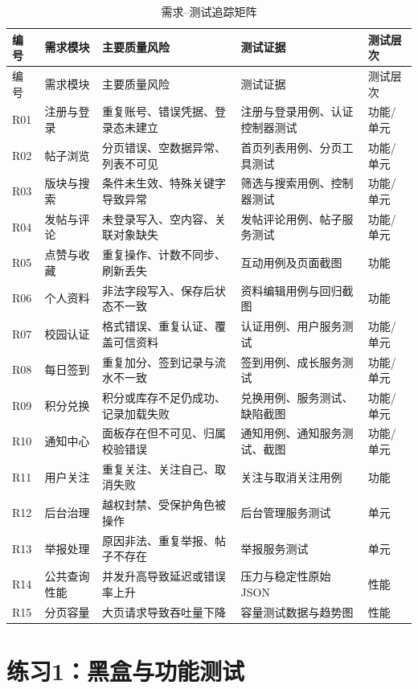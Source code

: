 \documentclass[bwprint]{report}
\begin{document}
\begin{longtable}{P{1.1cm}P{3.0cm}P{3.3cm}P{4.3cm}P{1.8cm}}
\caption{需求--测试追踪矩阵}\label{tab:traceability}\\
\toprule
编号 & 需求模块 & 主要质量风险 & 测试证据 & 测试层次 \\
\midrule
\endfirsthead
\toprule
编号 & 需求模块 & 主要质量风险 & 测试证据 & 测试层次 \\
\midrule
\endhead
R01 & 注册与登录 & 重复账号、错误凭据、登录态未建立 & 注册与登录用例、认证控制器测试 & 功能/单元 \\
R02 & 帖子浏览 & 分页错误、空数据异常、列表不可见 & 首页列表用例、分页工具测试 & 功能/单元 \\
R03 & 版块与搜索 & 条件未生效、特殊关键字导致异常 & 筛选与搜索用例、控制器测试 & 功能/单元 \\
R04 & 发帖与评论 & 未登录写入、空内容、关联对象缺失 & 发帖评论用例、帖子服务测试 & 功能/单元 \\
R05 & 点赞与收藏 & 重复操作、计数不同步、刷新丢失 & 互动用例及页面截图 & 功能 \\
R06 & 个人资料 & 非法字段写入、保存后状态不一致 & 资料编辑用例与回归截图 & 功能 \\
R07 & 校园认证 & 格式错误、重复认证、覆盖可信资料 & 认证用例、用户服务测试 & 功能/单元 \\
R08 & 每日签到 & 重复加分、签到记录与流水不一致 & 签到用例、成长服务测试 & 功能/单元 \\
R09 & 积分兑换 & 积分或库存不足仍成功、记录加载失败 & 兑换用例、服务测试、缺陷截图 & 功能/单元 \\
R10 & 通知中心 & 面板存在但不可见、归属校验错误 & 通知用例、通知服务测试、截图 & 功能/单元 \\
R11 & 用户关注 & 重复关注、关注自己、取消失败 & 关注与取消关注用例 & 功能 \\
R12 & 后台治理 & 越权封禁、受保护角色被操作 & 后台管理服务测试 & 单元 \\
R13 & 举报处理 & 原因非法、重复举报、帖子不存在 & 举报服务测试 & 单元 \\
R14 & 公共查询性能 & 并发升高导致延迟或错误率上升 & 压力与稳定性原始JSON & 性能 \\
R15 & 分页容量 & 大页请求导致吞吐量下降 & 容量测试数据与趋势图 & 性能 \\
\bottomrule
\end{longtable}

\section{练习1：黑盒与功能测试}
\end{document}
